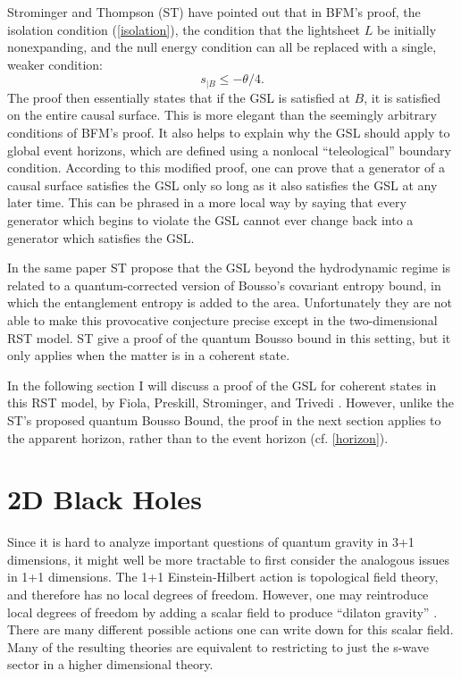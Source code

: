 \documentclass{article}
\begin{document}
Strominger and Thompson (ST) \cite{ST04} have pointed out that in BFM's proof, the isolation condition (\ref{isolation}), the condition that the lightsheet $L$ be initially nonexpanding, and the null energy condition can all be replaced with a single, weaker condition:
\begin{equation}
s_{|B} \le -\theta/4.
\end{equation}
The proof then essentially states that if the GSL is satisfied at $B$, it is satisfied on the entire causal surface.  This is more elegant than the seemingly arbitrary conditions of BFM's proof.  It also helps to explain why the GSL should apply to global event horizons, which are defined using a nonlocal ``teleological'' boundary condition.  According to this modified proof, one can prove that a generator of a causal surface satisfies the GSL only so long as it also satisfies the GSL at any later time.  This can be phrased in a more local way by saying that every generator which begins to violate the GSL cannot ever change back into a generator which satisfies the GSL.

In the same paper ST propose that the GSL beyond the hydrodynamic regime is related to a quantum-corrected version of Bousso's covariant entropy bound, in which the entanglement entropy is added to the area.  Unfortunately they are not able to make this provocative conjecture precise except in the two-dimensional RST model.  ST give a proof of the quantum Bousso bound in this setting, but it only applies when the matter is in a coherent state.

In the following section I will discuss a proof of the GSL for coherent states in this RST model, by Fiola, Preskill, Strominger, and Trivedi \cite{fiola94}.  However, unlike the ST's proposed quantum Bousso Bound, the proof in the next section applies to the apparent horizon, rather than to the event horizon (cf. \ref{horizon}).

\section{2D Black Holes}\label{2D}

Since it is hard to analyze important questions of quantum gravity in 3+1 dimensions, it might well be more tractable to first consider the analogous issues in 1+1 dimensions.  The 1+1 Einstein-Hilbert action is topological field theory, and therefore has no local degrees of freedom.  However, one may reintroduce local degrees of freedom by adding a scalar field to produce ``dilaton gravity'' \cite{fiola94}.  There are many different possible actions one can write down for this scalar field.  Many of the resulting theories are equivalent to restricting to just the s-wave sector in a higher dimensional theory.
\end{document}
